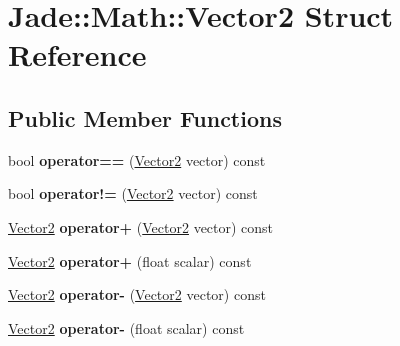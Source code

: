 \hypertarget{struct_jade_1_1_math_1_1_vector2}{}\section{Jade\+:\+:Math\+:\+:Vector2 Struct Reference}
\label{struct_jade_1_1_math_1_1_vector2}
\subsection*{Public Member Functions}
\begin{DoxyCompactItemize}
\item 
\hypertarget{struct_jade_1_1_math_1_1_vector2_a8feae16d1d479e0e1c75ec532f070ab9}{}bool {\bfseries operator==} (\hyperlink{struct_jade_1_1_math_1_1_vector2}{Vector2} vector) const \label{struct_jade_1_1_math_1_1_vector2_a8feae16d1d479e0e1c75ec532f070ab9}

\item 
\hypertarget{struct_jade_1_1_math_1_1_vector2_ac9c296dee9e69b556aeb847473a6aef1}{}bool {\bfseries operator!=} (\hyperlink{struct_jade_1_1_math_1_1_vector2}{Vector2} vector) const \label{struct_jade_1_1_math_1_1_vector2_ac9c296dee9e69b556aeb847473a6aef1}

\item 
\hypertarget{struct_jade_1_1_math_1_1_vector2_aa06d68a270441def99c68e7cd5acb469}{}\hyperlink{struct_jade_1_1_math_1_1_vector2}{Vector2} {\bfseries operator+} (\hyperlink{struct_jade_1_1_math_1_1_vector2}{Vector2} vector) const \label{struct_jade_1_1_math_1_1_vector2_aa06d68a270441def99c68e7cd5acb469}

\item 
\hypertarget{struct_jade_1_1_math_1_1_vector2_ae1e5f3ec53951f11a7fac9e76909c088}{}\hyperlink{struct_jade_1_1_math_1_1_vector2}{Vector2} {\bfseries operator+} (float scalar) const \label{struct_jade_1_1_math_1_1_vector2_ae1e5f3ec53951f11a7fac9e76909c088}

\item 
\hypertarget{struct_jade_1_1_math_1_1_vector2_a7ea27a11d1e7edb67136c61ba3509909}{}\hyperlink{struct_jade_1_1_math_1_1_vector2}{Vector2} {\bfseries operator-\/} (\hyperlink{struct_jade_1_1_math_1_1_vector2}{Vector2} vector) const \label{struct_jade_1_1_math_1_1_vector2_a7ea27a11d1e7edb67136c61ba3509909}

\item 
\hypertarget{struct_jade_1_1_math_1_1_vector2_a4206930454055a47a5ed3b22d39543d2}{}\hyperlink{struct_jade_1_1_math_1_1_vector2}{Vector2} {\bfseries operator-\/} (float scalar) const \label{struct_jade_1_1_math_1_1_vector2_a4206930454055a47a5ed3b22d39543d2}


\end{DoxyCompactItemize}

